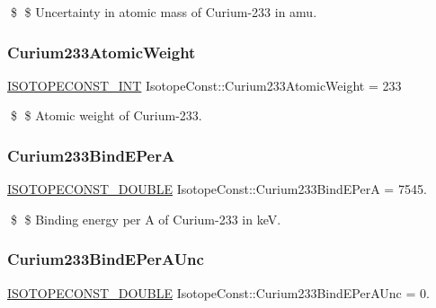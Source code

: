 \$ \$ Uncertainty in atomic mass of Curium-\/233 in amu. \mbox{\label{group___isotope_const-_curium-_cm233_ga86e624a63806a4e380d030419d3c6867}} 
\subsubsection{\texorpdfstring{Curium233\+Atomic\+Weight}{Curium233AtomicWeight}}
{\footnotesize\ttfamily \mbox{\hyperlink{group___isotope_const-_macros_ga5f18360b3e99483a35c32d789e62621c}{I\+S\+O\+T\+O\+P\+E\+C\+O\+N\+S\+T\+\_\+\+I\+NT}} Isotope\+Const\+::\+Curium233\+Atomic\+Weight = 233}

\$ \$ Atomic weight of Curium-\/233. \mbox{\label{group___isotope_const-_curium-_cm233_gacb67ccc5b07d4ccac10a9cd78273636a}} 
\subsubsection{\texorpdfstring{Curium233\+Bind\+E\+PerA}{Curium233BindEPerA}}
{\footnotesize\ttfamily \mbox{\hyperlink{group___isotope_const-_macros_ga8f45a7272ce02c0b4c65c44636ed719a}{I\+S\+O\+T\+O\+P\+E\+C\+O\+N\+S\+T\+\_\+\+D\+O\+U\+B\+LE}} Isotope\+Const\+::\+Curium233\+Bind\+E\+PerA = 7545.}

\$ \$ Binding energy per A of Curium-\/233 in keV. \mbox{\label{group___isotope_const-_curium-_cm233_gafa2f08a352a2790e69e4e25a5be02df6}} 
\subsubsection{\texorpdfstring{Curium233\+Bind\+E\+Per\+A\+Unc}{Curium233BindEPerAUnc}}
{\footnotesize\ttfamily \mbox{\hyperlink{group___isotope_const-_macros_ga8f45a7272ce02c0b4c65c44636ed719a}{I\+S\+O\+T\+O\+P\+E\+C\+O\+N\+S\+T\+\_\+\+D\+O\+U\+B\+LE}} Isotope\+Const\+::\+Curium233\+Bind\+E\+Per\+A\+Unc = 0.}

